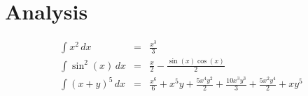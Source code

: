 \documentclass[12pt]{article}
\begin{document}
    \section{Analysis}\label{sec:analysis}

    \begin{align}
        \int x^{2}\, dx &=& \frac{x^{3}}{3} \\
        \int \sin^{2}{\left(x \right)}\, dx &=& \frac{x}{2} - \frac{\sin{\left(x \right)} \cos{\left(x \right)}}{2} \\
        \int \left(x + y\right)^{5}\, dx &=& \frac{x^{6}}{6} + x^{5} y + \frac{5 x^{4} y^{2}}{2} + \frac{10 x^{3} y^{3}}{3} + \frac{5 x^{2} y^{4}}{2} + x y^{5}
    \end{align}
\end{document}
